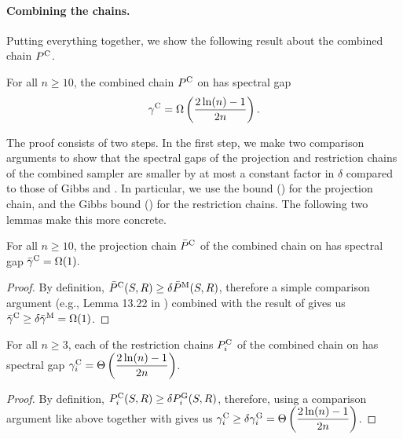 \paragraph{Combining the chains.}
Putting everything together, we show the following result about the combined chain $P^{\mathrm{C}}$.
\begin{theorem} \label{thm:combo}
  For all $n \geq 10$, the combined chain $P^{\mathrm{C}}$ on \ising{} has spectral gap
  \begin{align*}
    \gamma^{\mathrm{C}} = \Omega\left( \displaystyle\frac{2\ln(n) - 1}{2n} \right).
  \end{align*}
\end{theorem}
\noindent The proof consists of two steps.
In the first step, we make two comparison arguments \citep{diaconis93,levin08book} to show that the spectral gaps of the projection and restriction chains of the combined sampler are smaller by at most a constant factor in $\delta$ compared to those of Gibbs and \Ms{}.
In particular, we use the \Ms{} bound () for the projection chain, and the Gibbs bound () for the restriction chains.
The following two lemmas make this more concrete.

\begin{lemma} \label{lem:cproj}
  For all $n \geq 10$, the projection chain $\bar{P}^{\mathrm{C}}$ of the combined chain on \ising{} has spectral gap $\bar{\gamma}^{\mathrm{C}} = \Omega(1).$
\end{lemma}

\begin{proof}
  By definition, $\bar{P}^{\mathrm{C}}(S, R) \geq \delta \bar{P}^{\mathrm{M}}(S, R)$, therefore a simple comparison argument (e.g., Lemma 13.22 in \citep{levin08book}) combined with the result of  gives us $\bar{\gamma}^{\mathrm{C}} \geq \delta \bar{\gamma}^{\mathrm{M}} = \Omega(1)$.
\end{proof}

\begin{lemma} \label{lem:crest}
  For all $n \geq 3$, each of the restriction chains $P^{\mathrm{C}}_i$ of the combined chain on \ising{} has spectral gap $\gamma^{\mathrm{C}}_i = \Theta\left(\displaystyle\frac{2\ln(n) - 1}{2n}\right)$.
\end{lemma}

\begin{proof}
  By definition, $P^{\mathrm{C}}_i(S, R) \geq \delta P^{\mathrm{G}}_i(S, R)$, therefore, using a comparison argument like above together with  gives us $\gamma^{\mathrm{C}}_i \geq \delta \gamma^{\mathrm{G}}_i = \Theta\left(\displaystyle\frac{2\ln(n) - 1}{2n}\right)$.
\end{proof}

